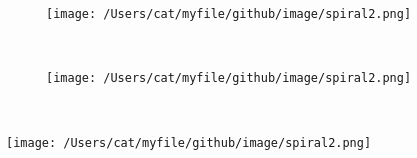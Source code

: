 \documentclass{book}
\begin{document}
\begin{figure}
\centering
\texttt{[image: /Users/cat/myfile/github/image/spiral2.png]} \\
\end{figure} \\

\begin{figure}
\texttt{[image: /Users/cat/myfile/github/image/spiral2.png]} \\
\end{figure} \\
\begin{center}
\texttt{[image: /Users/cat/myfile/github/image/spiral2.png]} \\
\end{center}
\end{document}
